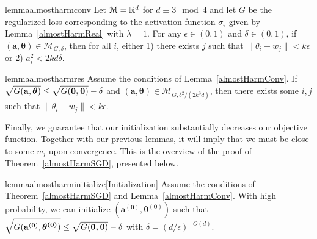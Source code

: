 %
\begin{restatable}{lemma}{almostharmconv}\label{almostHarmConv}
Let $\mathcal{M} = {\mathbb{R}}^d$ for $d \equiv 3 \mod 4$ and let $G$ be the regularized loss corresponding to the activation function $\sigma_\epsilon$ given by Lemma~\ref{almostHarmReal} with $\lambda =1$. For any $\epsilon \in (0,1)$ and $\delta \in (0, 1)$, if $\boldsymbol{(a,\theta)} \in \mathcal{M}_{G,\delta}$, then for all $i$, either 1) there exists $j$ such that $\|\theta_i - w_j\| < k\epsilon$ or 2) $a_i^2 < 2kd\delta$.
\end{restatable}
%
\begin{restatable}{lemma}{almostharmres}\label{almostHarmRes}
  Assume the conditions of Lemma~\ref{almostHarmConv}. If
$\sqrt{G({\bf a, \boldsymbol{\theta}})} \leq \sqrt{G(\boldsymbol{0,0})} - \delta$
  and $(\boldsymbol{a,\theta}) \in \mathcal{M}_{G,\delta^2/(2k^3d)}$,
  then there exists some $i, j$ such that $\|\theta_i - w_j\| <k\epsilon$.
\end{restatable}
 Finally, we guarantee that our initialization substantially decreases our objective function. Together with our previous lemmas, it will imply that we must be close to some $w_j$ upon convergence. This is the overview of the proof of Theorem~\ref{almostHarmSGD}, presented below.
 \begin{restatable}{lemma}{almostharminitialize}[Initialization]\label{almostHarmInitialize}
Assume the conditions of Theorem~\ref{almostHarmSGD} and Lemma~\ref{almostHarmConv}. With high probability, we can initialize $\boldsymbol{(a^{(0)},\theta^{(0)})}$ such that $\sqrt{G({\bf a^{(0)}}, \boldsymbol{\theta^{(0)}})} \leq \sqrt{G(\boldsymbol{0,0})} -\delta$ with $\delta = (d/\epsilon)^{ - O(d)}$.
 \end{restatable}
